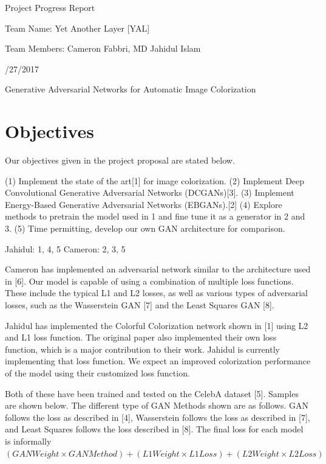 \documentclass[11pt]{article}
\begin{document}
\centerline{\sc \large Project Progress Report}
\vspace{.5pc}
\centerline{\sc Team Name: Yet Another Layer [YAL]}
\centerline{\sc Team Members: Cameron Fabbri, MD Jahidul Islam}
\centerline{/27/2017}
\vspace{2pc}

\centerline{\sc \large Generative Adversarial Networks for Automatic Image Colorization }

\section{Objectives}
Our objectives given in the project proposal are stated below. 

\noindent (1) Implement the state of the art[1] for image colorization. \newline
\noindent (2) Implement Deep Convolutional Generative Adversarial Networks (DCGANs)[3]. \newline
\noindent (3) Implement Energy-Based Generative Adversarial Networks (EBGANs).[2] \newline
\noindent (4) Explore methods to pretrain the model used in 1 and fine tune it as a generator in 2 and 3.
\newline
\noindent (5) Time permitting, develop our own GAN architecture for comparison. \newline

\noindent Jahidul: 1, 4, 5 \newline
\noindent Cameron: 2, 3, 5 \newline

\noindent Cameron has implemented an adversarial network similar to the architecture used in [6]. Our model
is capable of using a combination of multiple loss functions. These include the typical L1 and L2 losses,
as well as various types of adversarial losses, such as the Wasserstein GAN [7] and the Least Squares GAN
[8].
\vspace{1pc}

\noindent Jahidul has implemented the Colorful Colorization network shown in [1] using L2 and L1 loss function. The original paper also implemented their own loss function, which is a major contribution to their work. Jahidul is currently implementing that loss function. We expect an improved colorization performance of the model using their customized loss function. 
\vspace{3mm}

\noindent Both of these have been trained and tested on the CelebA dataset [5]. Samples are shown below.
The different type of GAN Methods shown are as follows. GAN follows the loss as described in [4],
Wasserstein follows the loss as described in [7], and Least Squares follows the loss described in [8]. The
final loss for each model is informally $(GAN Weight \times GAN Method) + (L1 Weight \times L1 Loss) +
(L2 Weight \times L2 Loss)$
\end{document}
